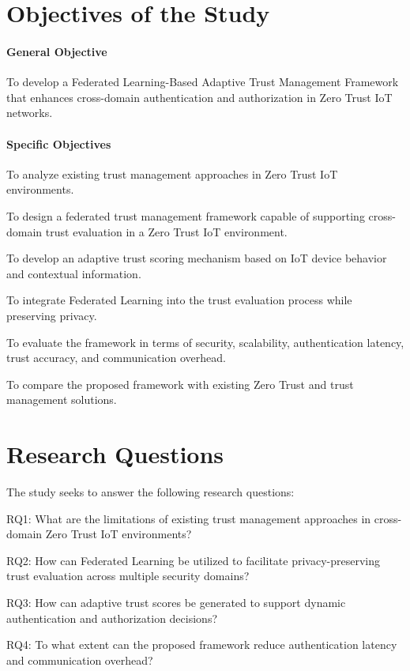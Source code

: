 \section{Objectives of the Study}

\paragraph{General Objective}

To develop a Federated Learning-Based Adaptive Trust Management Framework that enhances cross-domain authentication and authorization in Zero Trust IoT networks.


\paragraph{Specific Objectives}

To analyze existing trust management approaches in Zero Trust IoT environments.


To design a federated trust management framework capable of supporting cross-domain trust evaluation in a Zero Trust IoT environment.


To develop an adaptive trust scoring mechanism based on IoT device behavior and contextual information.


To integrate Federated Learning into the trust evaluation process while preserving privacy.


To evaluate the framework in terms of security, scalability, authentication latency, trust accuracy, and communication overhead.


To compare the proposed framework with existing Zero Trust and trust management solutions.


\section{Research Questions}

The study seeks to answer the following research questions:


RQ1: What are the limitations of existing trust management approaches in cross-domain Zero Trust IoT environments?


RQ2: How can Federated Learning be utilized to facilitate privacy-preserving trust evaluation across multiple security domains?


RQ3: How can adaptive trust scores be generated to support dynamic authentication and authorization decisions?


RQ4: To what extent can the proposed framework reduce authentication latency and communication overhead?



